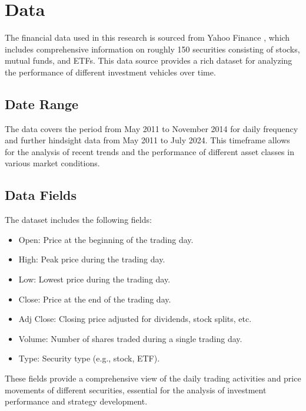\section{Data}
The financial data used in this research is sourced from Yahoo Finance \citep{yfinance}, which includes comprehensive information on roughly 150 securities consisting of stocks, mutual funds, and ETFs. This data source provides a rich dataset for analyzing the performance of different investment vehicles over time.

\subsection{Date Range}
The data covers the period from May 2011 to November 2014 for daily frequency and further hindsight data from May 2011 to July 2024. This timeframe allows for the analysis of recent trends and the performance of different asset classes in various market conditions.

\subsection{Data Fields}
The dataset includes the following fields:
\begin{itemize}
    \item Open: Price at the beginning of the trading day.
    \item High: Peak price during the trading day.
    \item Low: Lowest price during the trading day.
    \item Close: Price at the end of the trading day.
    \item Adj Close: Closing price adjusted for dividends, stock splits, etc.
    \item Volume: Number of shares traded during a single trading day.
    \item Type: Security type (e.g., stock, ETF).
\end{itemize}

These fields provide a comprehensive view of the daily trading activities and price movements of different securities, essential for the analysis of investment performance and strategy development.

\newpage
